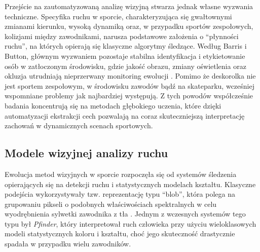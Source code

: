         Przejście na zautomatyzowaną analizę wizyjną stwarza jednak własne wyzwania techniczne. Specyfika ruchu w sporcie, charakteryzująca się gwałtownymi zmianami kierunku, wysoką dynamiką oraz, w przypadku sportów zespołowych, kolizjami między zawodnikami, narusza podstawowe założenia o \enquote{płynności ruchu}, na których opierają się klasyczne algorytmy śledzące. Według Barris i Button, głównym wyzwaniem pozostaje stabilna identyfikacja i etykietowanie osób w zatłoczonym środowisku, gdzie jakość obrazu, zmiany oświetlenia oraz okluzja utrudniają nieprzerwany monitoring ewolucji \cite{barris2008review}. Pomimo że deskorolka nie jest sportem zespołowym, w środowisku zawodów bądź na skateparku, wcześniej wspomniane problemy jak najbardziej występują. Z tych powodów współcześnie badania koncentrują się na metodach głębokiego uczenia, które dzięki automatyzacji ekstrakcji cech pozwalają na coraz skuteczniejszą interpretację zachowań w dynamicznych scenach sportowych. 

    \subsection{Modele wizyjnej analizy ruchu}
        
        Ewolucja metod wizyjnych w sporcie rozpoczęła się od systemów śledzenia opierających się na detekcji ruchu i statystycznych modelach kształtu. Klasyczne podejścia wykorzystywały tzw. reprezentację typu \enquote{blob}, która polega na grupowaniu pikseli o podobnych właściwościach spektralnych w celu wyodrębnienia sylwetki zawodnika z tła \cite{barris2008review}. Jednym z wczesnych systemów tego typu był \textit{Pfinder}, który interpretował ruch człowieka przy użyciu wieloklasowych modeli statystycznych koloru i kształtu, choć jego skuteczność drastycznie spadała w przypadku wielu zawodników.

